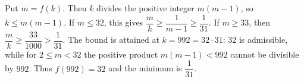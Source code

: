 Put $m=f(k)$. Then $k$ divides the positive integer $m(m-1)$, so $k\le m(m-1)$. If $m\le32$, this gives $\dfrac{m}{k}\ge\dfrac{1}{m-1}\ge\dfrac{1}{31}$. If $m\ge33$, then $\dfrac{m}{k}\ge\dfrac{33}{1000}>\dfrac{1}{31}$. The bound is attained at $k=992=32\cdot31$: $32$ is admissible, while for $2\le m<32$ the positive product $m(m-1)<992$ cannot be divisible by $992$. Thus $f(992)=32$ and the minimum is $\boxed{\dfrac{1}{31}}$.
